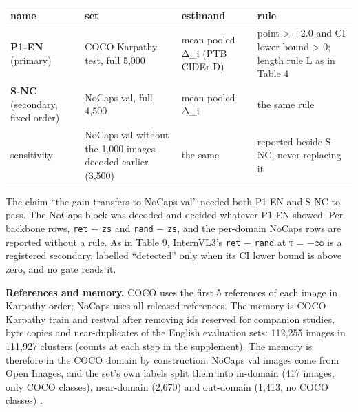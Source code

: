 \documentclass[manuscript,screen]{acmart}
\begin{document}
\begin{longtable}[]{@{}
  >{\raggedright\arraybackslash}p{}
  >{\raggedright\arraybackslash}p{}
  >{\raggedright\arraybackslash}p{}
  >{\raggedright\arraybackslash}p{}@{}}
\toprule\noalign{}
\begin{minipage}[b]{\linewidth}\raggedright
name
\end{minipage} & \begin{minipage}[b]{\linewidth}\raggedright
set
\end{minipage} & \begin{minipage}[b]{\linewidth}\raggedright
estimand
\end{minipage} & \begin{minipage}[b]{\linewidth}\raggedright
rule
\end{minipage} \\
\midrule\noalign{}
\endhead
\bottomrule\noalign{}
\endlastfoot
\textbf{P1-EN} (primary) & COCO Karpathy test, full 5,000 \citep{Lin2014COCO, Karpathy2015Split} &
mean pooled Δ\_i (PTB CIDEr-D) & point \textgreater{} +2.0 and CI lower bound \textgreater{} 0;
length rule L as in Table 4 \\
\textbf{S-NC} (secondary, fixed order) & NoCaps val, full 4,500 \citep{Agrawal2019NoCaps} & mean
pooled Δ\_i & the same rule \\
sensitivity & NoCaps val without the 1,000 images decoded earlier (3,500) & the same & reported
beside S-NC, never replacing it \\
\end{longtable}

The claim ``the gain transfers to NoCaps val'' needed both P1-EN and S-NC to pass. The NoCaps block
was decoded and decided whatever P1-EN showed. Per-backbone rows, \texttt{ret} − \texttt{zs} and
\texttt{rand} − \texttt{zs}, and the per-domain NoCaps rows are reported without a rule. As in Table
9, InternVL3's \texttt{ret} − \texttt{rand} at τ = −∞ is a registered secondary, labelled
``detected'' only when its CI lower bound is above zero, and no gate reads it.

\textbf{References and memory.} COCO uses the first 5 references of each image in Karpathy order;
NoCaps uses all released references. The memory is COCO Karpathy train and restval after removing
ids reserved for companion studies, byte copies and near-duplicates of the English evaluation sets:
112,255 images in 111,927 clusters (counts at each step in the supplement). The memory is therefore
in the COCO domain by construction. NoCaps val images come from Open Images, and the set's own
labels split them into in-domain (417 images, only COCO classes), near-domain (2,670) and out-domain
(1,413, no COCO classes) \citep{Agrawal2019NoCaps}.
\end{document}
